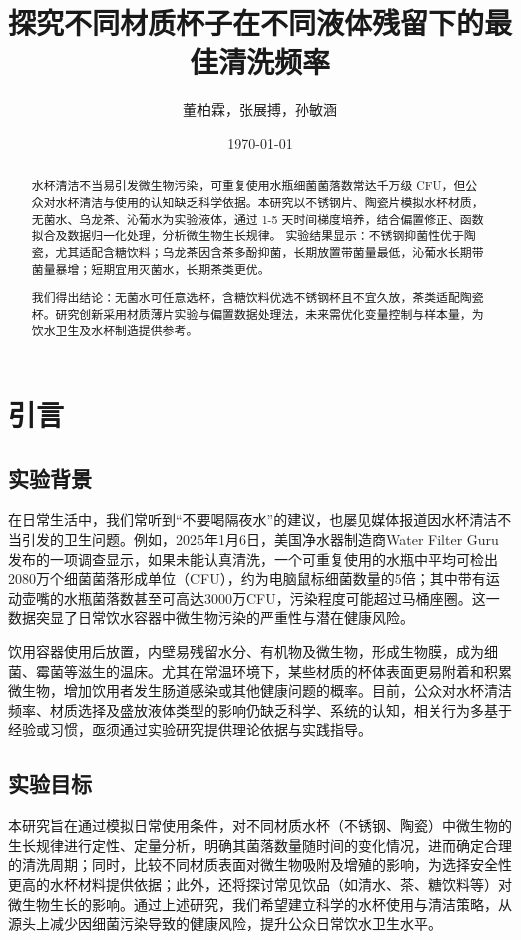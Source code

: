 \documentclass[12pt,a4paper]{ctexart}
\title{探究不同材质杯子在不同液体残留下的最佳清洗频率}
\author{董柏霖，张展搏，孙敏涵}
\date{\today}  %
\begin{document}
\maketitle  %

\begin{abstract}
水杯清洁不当易引发微生物污染，可重复使用水瓶细菌菌落数常达千万级 CFU，但公众对水杯清洁与使用的认知缺乏科学依据。本研究以不锈钢片、陶瓷片模拟水杯材质，无菌水、乌龙茶、沁葡水为实验液体，通过 1-5 天时间梯度培养，结合偏置修正、函数拟合及数据归一化处理，分析微生物生长规律。
实验结果显示：不锈钢抑菌性优于陶瓷，尤其适配含糖饮料；乌龙茶因含茶多酚抑菌，长期放置带菌量最低，沁葡水长期带菌量暴增；短期宜用灭菌水，长期茶类更优。

我们得出结论：无菌水可任意选杯，含糖饮料优选不锈钢杯且不宜久放，茶类适配陶瓷杯。研究创新采用材质薄片实验与偏置数据处理法，未来需优化变量控制与样本量，为饮水卫生及水杯制造提供参考。
\end{abstract}
\newpage
\tableofcontents
\newpage

\section{引言}
\subsection{实验背景}

在日常生活中，我们常听到“不要喝隔夜水”的建议，也屡见媒体报道因水杯清洁不当引发的卫生问题。例如，2025年1月6日，美国净水器制造商Water Filter Guru发布的一项调查显示，如果未能认真清洗，一个可重复使用的水瓶中平均可检出2080万个细菌菌落形成单位（CFU），约为电脑鼠标细菌数量的5倍；其中带有运动壶嘴的水瓶菌落数甚至可高达3000万CFU，污染程度可能超过马桶座圈。这一数据突显了日常饮水容器中微生物污染的严重性与潜在健康风险。

饮用容器使用后放置，内壁易残留水分、有机物及微生物，形成生物膜，成为细菌、霉菌等滋生的温床。尤其在常温环境下，某些材质的杯体表面更易附着和积累微生物，增加饮用者发生肠道感染或其他健康问题的概率。目前，公众对水杯清洁频率、材质选择及盛放液体类型的影响仍缺乏科学、系统的认知，相关行为多基于经验或习惯，亟须通过实验研究提供理论依据与实践指导。

\subsection{实验目标}

本研究旨在通过模拟日常使用条件，对不同材质水杯（不锈钢、陶瓷）中微生物的生长规律进行定性、定量分析，明确其菌落数量随时间的变化情况，进而确定合理的清洗周期；同时，比较不同材质表面对微生物吸附及增殖的影响，为选择安全性更高的水杯材料提供依据；此外，还将探讨常见饮品（如清水、茶、糖饮料等）对微生物生长的影响。通过上述研究，我们希望建立科学的水杯使用与清洁策略，从源头上减少因细菌污染导致的健康风险，提升公众日常饮水卫生水平。
\end{document}

